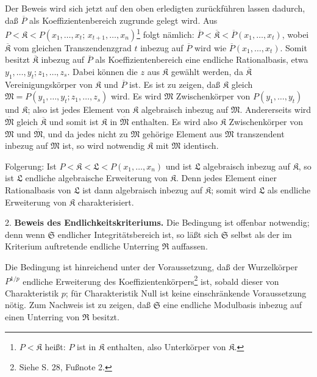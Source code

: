 Der Beweis wird sich jetzt auf den oben erledigten zurückführen lassen dadurch, daß $\overline P$ als Koeffizientenbereich zugrunde gelegt wird. Aus $P<\mathfrak K< P(x_1,\ldots,x_t;\,x_{t+1},\ldots,x_n)$\footnote{$P<\mathfrak K$ heißt: $P$ ist in $\mathfrak K$ enthalten, also Unterkörper von $\mathfrak K$.} folgt nämlich: $\overline P<\overline{\mathfrak K}<\overline P(x_1,\ldots,x_t)$, wobei $\overline{\mathfrak K}$ vom gleichen Transzendenzgrad $t$ inbezug auf $\overline P$ wird wie $\overline P(x_1,\ldots,x_t)$. Somit besitzt $\overline{\mathfrak K}$ inbezug auf $\overline P$ als Koeffizientenbereich eine endliche Rationalbasis, etwa $y_1,\ldots,y_t; z_1,\ldots,z_s$. Dabei können die $z$ aus $\mathfrak K$ gewählt werden, da $\overline{\mathfrak K}$ Vereinigungskörper von $\mathfrak K$ und $\overline P$ ist. Es ist zu zeigen, daß $\mathfrak K$ gleich $\mathfrak M=P(y_1,\ldots,y_t;z_1,\ldots,z_s)$ wird. Es wird $\mathfrak M$ Zwischenkörper von $P(y_1,\ldots,y_t)$ und $\mathfrak K$; also ist jedes Element von $\mathfrak K$ algebraisch inbezug auf $\mathfrak M$. Andererseits wird $\overline{\mathfrak M}$ gleich $\overline{\mathfrak K}$ und somit ist $\mathfrak K$ in $\overline{\mathfrak M}$ enthalten. Es wird also $\mathfrak K$ Zwischenkörper von $\mathfrak M$ und $\overline{\mathfrak M}$, und da jedes nicht zu $\mathfrak M$ gehörige Element aus $\overline{\mathfrak M}$ transzendent inbezug auf $\mathfrak M$ ist, so wird notwendig $\mathfrak K$ mit $\mathfrak M$ identisch.

Folgerung: Ist $P<\mathfrak K<\mathfrak L<P(x_1,\ldots,x_n)$ und ist $\mathfrak L$ algebraisch inbezug auf $\mathfrak K$, so ist $\mathfrak L$ endliche algebraische Erweiterung von $\mathfrak K$. Denn jedes Element einer Rationalbasis von $\mathfrak L$ ist dann algebraisch inbezug auf $\mathfrak K$; somit wird $\mathfrak L$ als endliche Erweiterung von $\mathfrak K$ charakterisiert.

2. \textbf{Beweis des Endlichkeitskriteriums.} Die Bedingung ist offenbar notwendig; denn wenn $\mathfrak S$ endlicher Integritätsbereich ist, so läßt sich $\mathfrak S$ selbst als der im Kriterium auftretende endliche Unterring $\mathfrak R$ auffassen.

Die Bedingung ist hinreichend unter der Voraussetzung, daß der Wurzelkörper $P^{1/p}$ endliche Erweiterung des Koeffizientenkörpers\footnote{Siehe S. 28, Fußnote 2.} ist, sobald dieser von Charakteristik $p$; für Charakteristik Null ist keine einschränkende Voraussetzung nötig. Zum Nachweis ist zu zeigen, daß $\mathfrak S$ eine endliche Modulbasis inbezug auf einen Unterring von $\mathfrak R$ besitzt.

